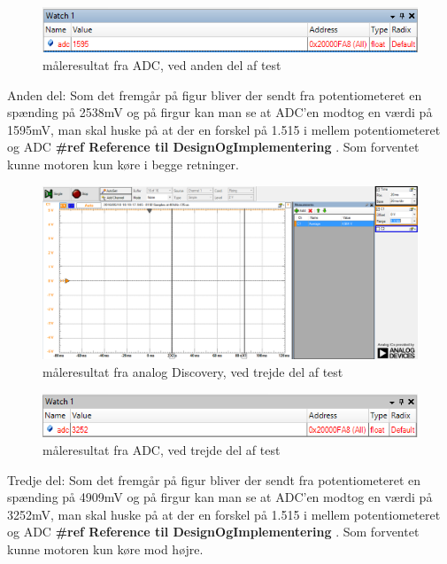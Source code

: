 \begin{figure}[H]
	\centering
	\includegraphics[width=\textwidth]{test/images/ModultestADC/mellemDebug}
	\caption{måleresultat fra ADC, ved anden del af test}
	\label{figure: ADCmid}
\end{figure}
Anden del: Som det fremgår på figur \label{fig:analogmid}  bliver der sendt fra potentiometeret en spænding på 2538mV og på firgur \label{fig:ADCmid}  kan man se at ADC’en modtog en værdi på 1595mV, man skal huske på at der en forskel på 1.515 i mellem potentiometeret og ADC \textbf{\#ref Reference til DesignOgImplementering }. 
Som forventet kunne motoren kun køre i begge retninger.\\


\begin{figure}[H]
	\centering
	\includegraphics[width=\textwidth]{test/images/ModultestADC/4904mVanalog}
	\caption{måleresultat fra analog Discovery, ved trejde del af test}
	\label{figure:analoghoj}
\end{figure}
\begin{figure}[H]
	\centering
	\includegraphics[width=\textwidth]{test/images/ModultestADC/opDebug}
	\caption{måleresultat fra ADC, ved trejde del af test}
	\label{figure: ADChoj}
\end{figure}
Tredje del: Som det fremgår på figur \label{fig:analoghoj} bliver der sendt fra potentiometeret en spænding på 4909mV og på firgur \label{fig:ADChoj}  kan man se at ADC’en modtog en værdi på 3252mV, man skal huske på at der en forskel på 1.515 i mellem potentiometeret og ADC \textbf{\#ref Reference til DesignOgImplementering }. 
Som forventet kunne motoren kun køre mod højre.





